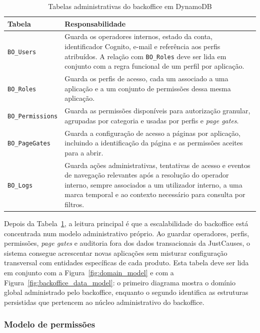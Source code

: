 \begin{table}[H]
\caption{Tabelas administrativas do backoffice em DynamoDB}
\label{tab:modelo_dados_admin}
\begin{center}
\small
\begin{tabular}{|l|p{9cm}|}
\hline
\textbf{Tabela} & \textbf{Responsabilidade} \\ \hline
\texttt{BO\_Users} & Guarda os operadores internos, estado da conta, identificador Cognito, e-mail e referência aos perfis atribuídos. A relação com \texttt{BO\_Roles} deve ser lida em conjunto com a regra funcional de um perfil por aplicação. \\ \hline
\texttt{BO\_Roles} & Guarda os perfis de acesso, cada um associado a uma aplicação e a um conjunto de permissões dessa mesma aplicação. \\ \hline
\texttt{BO\_Permissions} & Guarda as permissões disponíveis para autorização granular, agrupadas por categoria e usadas por perfis e \textit{page gates}. \\ \hline
\texttt{BO\_PageGates} & Guarda a configuração de acesso a páginas por aplicação, incluindo a identificação da página e as permissões aceites para a abrir. \\ \hline
\texttt{BO\_Logs} & Guarda ações administrativas, tentativas de acesso e eventos de navegação relevantes após a resolução do operador interno, sempre associados a um utilizador interno, a uma marca temporal e ao contexto necessário para consulta por filtros. \\ \hline
\end{tabular}
\end{center}
\end{table}

Depois da Tabela~\ref{tab:modelo_dados_admin}, a leitura principal é que a escalabilidade do backoffice está concentrada num modelo administrativo próprio. Ao guardar operadores, perfis, permissões, \textit{page gates} e auditoria fora dos dados transacionais da JustCauses, o sistema consegue acrescentar novas aplicações sem misturar configuração transversal com entidades específicas de cada produto. Esta tabela deve ser lida em conjunto com a Figura~\ref{fig:domain_model} e com a Figura~\ref{fig:backoffice_data_model}: o primeiro diagrama mostra o domínio global administrado pelo backoffice, enquanto o segundo identifica as estruturas persistidas que pertencem ao núcleo administrativo do backoffice.

\subsubsection{Modelo de permissões}
\label{sec:modelo_permissoes}

